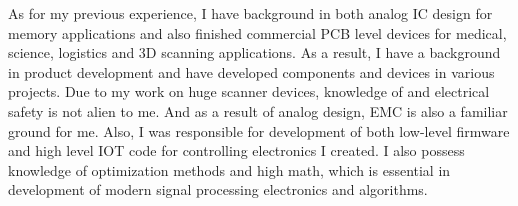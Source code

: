 


As for my previous experience, I have background in both analog IC design for memory applications and also finished commercial PCB level devices for medical, science, logistics and 3D scanning applications. As a result, I have a background in product development and have developed components and devices in various projects.
Due to my work on huge scanner devices, knowledge of and electrical safety is not alien to me. And as a result of analog design, EMC is also a familiar ground for me.
Also, I was responsible for development of both low-level firmware and high level IOT code for controlling electronics I created. I also possess knowledge of optimization methods and high math, which is essential in development of modern signal processing electronics and algorithms.


